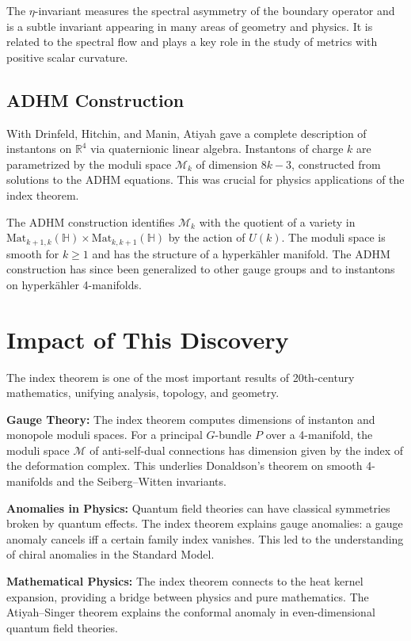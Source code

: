 The $\eta$-invariant measures the spectral asymmetry of the boundary operator
and is a subtle invariant appearing in many areas of geometry and physics.
It is related to the spectral flow and plays a key role in the study of
metrics with positive scalar curvature.

\subsection*{ADHM Construction}

With Drinfeld, Hitchin, and Manin, Atiyah gave a complete description of
instantons on $\mathbb{R}^4$ via quaternionic linear algebra. Instantons of
charge $k$ are parametrized by the moduli space $\mathcal{M}_k$ of dimension
$8k - 3$, constructed from solutions to the ADHM equations. This was crucial
for physics applications of the index theorem.

The ADHM construction identifies $\mathcal{M}_k$ with the quotient of a
variety in $\text{Mat}_{k+1,k}(\mathbb{H}) \times \text{Mat}_{k,k+1}(\mathbb{H})$
by the action of $U(k)$. The moduli space is smooth for $k \geq 1$ and has
the structure of a hyperkähler manifold. The ADHM construction has
since been generalized to other gauge groups and to instantons on
hyperkähler 4-manifolds.

\section{Impact of This Discovery}

The index theorem is one of the most important results of 20th-century
mathematics, unifying analysis, topology, and geometry.

\textbf{Gauge Theory:} The index theorem computes dimensions of instanton and
monopole moduli spaces. For a principal $G$-bundle $P$ over a 4-manifold, the
moduli space $\mathcal{M}$ of anti-self-dual connections has dimension given by
the index of the deformation complex. This underlies Donaldson's theorem on
smooth 4-manifolds and the Seiberg--Witten invariants.

\textbf{Anomalies in Physics:} Quantum field theories can have classical
symmetries broken by quantum effects. The index theorem explains gauge anomalies:
a gauge anomaly cancels iff a certain family index vanishes. This led to the
understanding of chiral anomalies in the Standard Model.

\textbf{Mathematical Physics:} The index theorem connects to the heat kernel
expansion, providing a bridge between physics and pure mathematics. The
Atiyah--Singer theorem explains the conformal anomaly in even-dimensional
quantum field theories.

